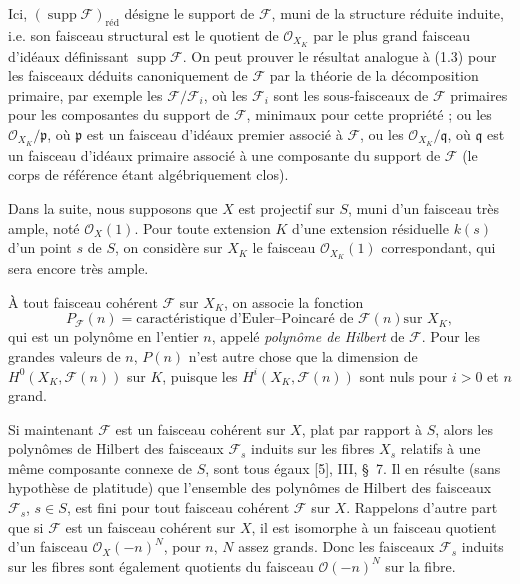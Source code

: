 Ici, $(\operatorname{supp}\mathcal F)_{\mathrm{réd}}$ désigne le support de
$\mathcal F$, muni de la structure réduite induite, i.e. son faisceau
structural est le quotient de $\mathcal O_{X_K}$ par le plus grand faisceau
d'idéaux définissant $\operatorname{supp}\mathcal F$. On peut prouver le
résultat analogue à (1.3) pour les faisceaux déduits canoniquement de
$\mathcal F$ par la théorie de la décomposition primaire, par exemple les
$\mathcal F/\mathcal F_i$, où les $\mathcal F_i$ sont les sous-faisceaux de
$\mathcal F$ primaires pour les composantes du support de $\mathcal F$,
minimaux pour cette propriété ; ou les $\mathcal O_{X_K}/\mathfrak p$, où
$\mathfrak p$ est un faisceau d'idéaux premier associé à $\mathcal F$, ou les
$\mathcal O_{X_K}/\mathfrak q$, où $\mathfrak q$ est un faisceau d'idéaux
primaire associé à une composante du support de $\mathcal F$ (le corps de
référence étant algébriquement clos).


Dans la suite, nous supposons que $X$ est projectif sur $S$, muni d'un faisceau
très ample, noté $\mathcal O_X(1)$. Pour toute extension $K$ d'une extension
résiduelle $k(s)$ d'un point $s$ de $S$, on considère sur $X_K$ le faisceau
$\mathcal O_{X_K}(1)$ correspondant, qui sera encore très ample.

À tout faisceau cohérent $\mathcal F$ sur $X_K$, on associe la fonction
\[
P_{\mathcal F}(n)=\text{caractéristique d'Euler--Poincaré de $\mathcal F(n)$
sur $X_K$},
\]
qui est un polynôme en l'entier $n$, appelé \emph{polynôme de Hilbert} de
$\mathcal F$. Pour les grandes valeurs de $n$, $P(n)$ n'est autre chose que la
dimension de $H^0(X_K,\mathcal F(n))$ sur $K$, puisque les
$H^i(X_K,\mathcal F(n))$ sont nuls pour $i>0$ et $n$ grand.

Si maintenant $\mathcal F$ est un faisceau cohérent sur $X$, plat par rapport
à $S$, alors les polynômes de Hilbert des faisceaux $\mathcal F_s$ induits sur
les fibres $X_s$ relatifs à une même composante connexe de $S$, sont tous égaux
[5], III, \S~7. Il en résulte (sans hypothèse de platitude) que l'ensemble des
polynômes de Hilbert des faisceaux $\mathcal F_s$, $s\in S$, est fini pour tout
faisceau cohérent $\mathcal F$ sur $X$.
Rappelons d'autre part que si $\mathcal F$ est un faisceau cohérent sur $X$, il
est isomorphe à un faisceau quotient d'un faisceau $\mathcal O_X(-n)^N$, pour
$n$, $N$ assez grands. Donc les faisceaux $\mathcal F_s$ induits sur les fibres
sont également quotients du faisceau $\mathcal O(-n)^N$ sur la fibre.

